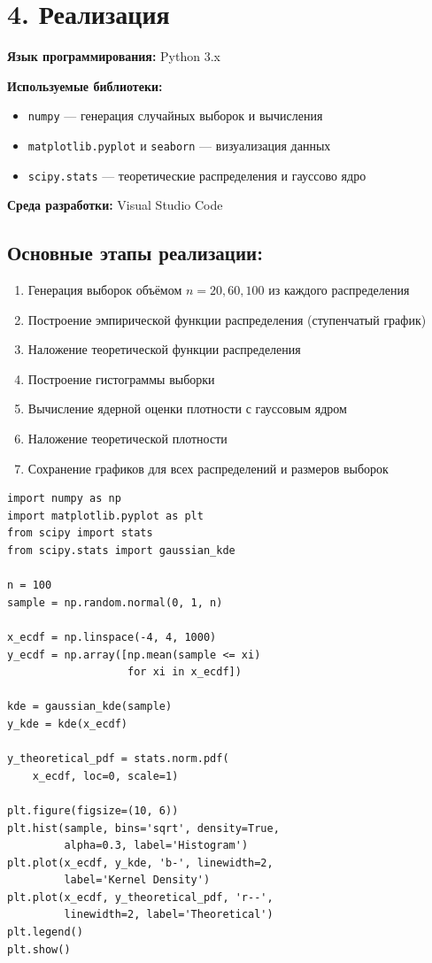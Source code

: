 \documentclass[a4paper,14pt]{extarticle}
\begin{document}
\section*{4. Реализация}

\textbf{Язык программирования:} Python 3.x

\textbf{Используемые библиотеки:}
\begin{itemize}
    \item \texttt{numpy} — генерация случайных выборок и вычисления
    \item \texttt{matplotlib.pyplot} и \texttt{seaborn} — визуализация данных
    \item \texttt{scipy.stats} — теоретические распределения и гауссово ядро
\end{itemize}

\textbf{Среда разработки:} Visual Studio Code

\subsection*{Основные этапы реализации:}

\begin{enumerate}
    \item Генерация выборок объёмом $n = 20, 60, 100$ из каждого распределения
    \item Построение эмпирической функции распределения (ступенчатый график)
    \item Наложение теоретической функции распределения
    \item Построение гистограммы выборки
    \item Вычисление ядерной оценки плотности с гауссовым ядром
    \item Наложение теоретической плотности
    \item Сохранение графиков для всех распределений и размеров выборок
\end{enumerate}

\begin{lstlisting}[caption={Построение ЭФР и ядерной оценки плотности}]
import numpy as np
import matplotlib.pyplot as plt
from scipy import stats
from scipy.stats import gaussian_kde

n = 100
sample = np.random.normal(0, 1, n)

x_ecdf = np.linspace(-4, 4, 1000)
y_ecdf = np.array([np.mean(sample <= xi) 
                   for xi in x_ecdf])

kde = gaussian_kde(sample)
y_kde = kde(x_ecdf)

y_theoretical_pdf = stats.norm.pdf(
    x_ecdf, loc=0, scale=1)

plt.figure(figsize=(10, 6))
plt.hist(sample, bins='sqrt', density=True, 
         alpha=0.3, label='Histogram')
plt.plot(x_ecdf, y_kde, 'b-', linewidth=2, 
         label='Kernel Density')
plt.plot(x_ecdf, y_theoretical_pdf, 'r--', 
         linewidth=2, label='Theoretical')
plt.legend()
plt.show()
\end{lstlisting}
\end{document}
